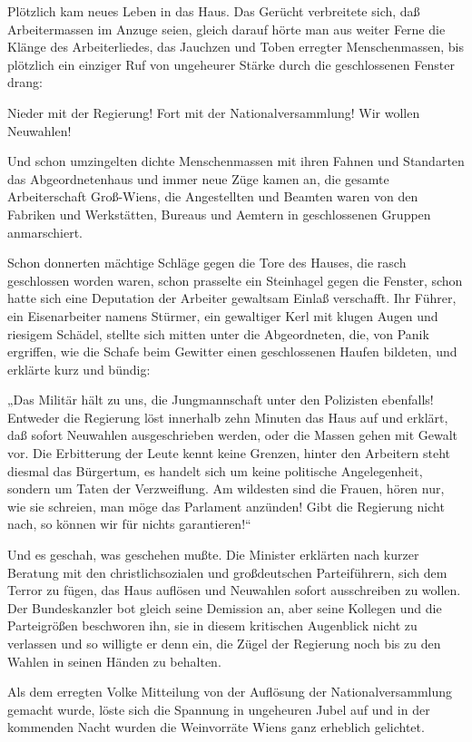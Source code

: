 Plötzlich kam neues Leben in das Haus. Das Gerücht
verbreitete sich, daß Arbeitermassen im Anzuge seien, gleich darauf
hörte man aus weiter Ferne die Klänge des Arbeiterliedes, das
Jauchzen und Toben erregter Menschenmassen, bis plötzlich ein
einziger Ruf von ungeheurer Stärke durch die geschlossenen Fenster
drang:

Nieder mit der Regierung! Fort mit der Nationalversammlung! Wir
wollen Neuwahlen!

Und schon umzingelten dichte Menschenmassen mit ihren Fahnen und
Standarten das Abgeordnetenhaus und immer neue Züge kamen an, die
gesamte Arbeiterschaft Groß-Wiens, die Angestellten und Beamten
waren von den Fabriken und Werkstätten, Bureaus und Aemtern in
geschlossenen Gruppen anmarschiert.

Schon donnerten mächtige Schläge gegen die Tore des Hauses, die
rasch geschlossen worden waren, schon prasselte ein Steinhagel
gegen die Fenster, schon hatte sich eine Deputation der Arbeiter
gewaltsam Einlaß verschafft. Ihr Führer, ein Eisenarbeiter namens
Stürmer, ein gewaltiger Kerl mit klugen Augen und riesigem Schädel,
stellte sich mitten unter die Abgeordneten, die, von Panik
ergriffen, wie die Schafe beim Gewitter einen geschlossenen Haufen
bildeten, und erklärte kurz und bündig:

„Das Militär hält zu uns, die Jungmannschaft unter den Polizisten
ebenfalls! Entweder die Regierung löst innerhalb zehn Minuten das
Haus auf und erklärt, daß sofort Neuwahlen ausgeschrieben werden,
oder die Massen gehen mit Gewalt vor. Die Erbitterung der Leute
kennt  keine Grenzen, hinter den Arbeitern steht
diesmal das Bürgertum, es handelt sich um keine politische
Angelegenheit, sondern um Taten der Verzweiflung. Am wildesten sind
die Frauen, hören  nur, wie sie schreien, man
möge das Parlament anzünden! Gibt die Regierung nicht nach, so
können wir für nichts garantieren!“

Und es geschah, was geschehen mußte. Die Minister erklärten nach
kurzer Beratung mit den christlichsozialen und großdeutschen
Parteiführern, sich dem Terror zu fügen, das Haus auflösen und
Neuwahlen sofort ausschreiben zu wollen. Der Bundeskanzler bot
gleich seine Demission an, aber seine Kollegen und die Parteigrößen
beschworen ihn, sie in diesem kritischen Augenblick nicht zu
verlassen und so willigte er denn ein, die Zügel der Regierung noch
bis zu den Wahlen in seinen Händen zu behalten.

Als dem erregten Volke Mitteilung von der Auflösung der
Nationalversammlung gemacht wurde, löste sich die Spannung in
ungeheuren Jubel auf und in der kommenden Nacht wurden die
Weinvorräte Wiens ganz erheblich gelichtet.

